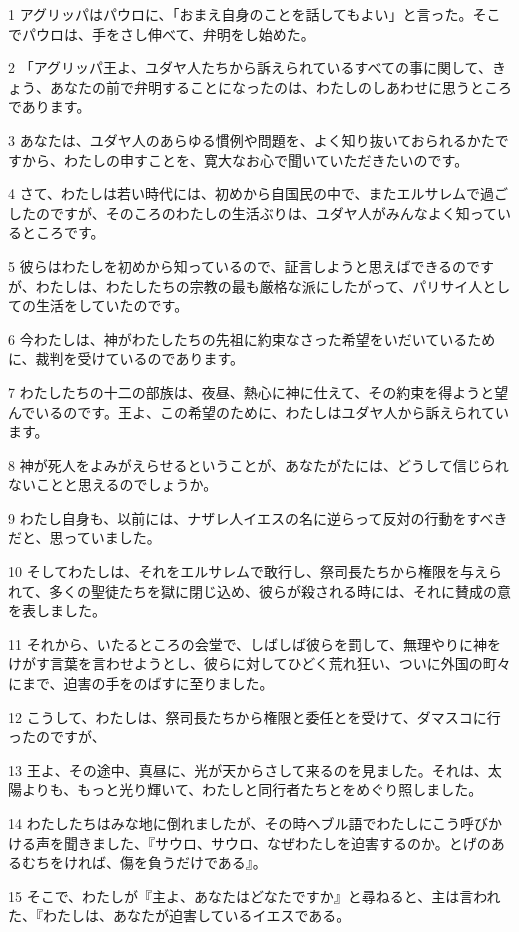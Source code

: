 \par 1 アグリッパはパウロに、「おまえ自身のことを話してもよい」と言った。そこでパウロは、手をさし伸べて、弁明をし始めた。
\par 2 「アグリッパ王よ、ユダヤ人たちから訴えられているすべての事に関して、きょう、あなたの前で弁明することになったのは、わたしのしあわせに思うところであります。
\par 3 あなたは、ユダヤ人のあらゆる慣例や問題を、よく知り抜いておられるかたですから、わたしの申すことを、寛大なお心で聞いていただきたいのです。
\par 4 さて、わたしは若い時代には、初めから自国民の中で、またエルサレムで過ごしたのですが、そのころのわたしの生活ぶりは、ユダヤ人がみんなよく知っているところです。
\par 5 彼らはわたしを初めから知っているので、証言しようと思えばできるのですが、わたしは、わたしたちの宗教の最も厳格な派にしたがって、パリサイ人としての生活をしていたのです。
\par 6 今わたしは、神がわたしたちの先祖に約束なさった希望をいだいているために、裁判を受けているのであります。
\par 7 わたしたちの十二の部族は、夜昼、熱心に神に仕えて、その約束を得ようと望んでいるのです。王よ、この希望のために、わたしはユダヤ人から訴えられています。
\par 8 神が死人をよみがえらせるということが、あなたがたには、どうして信じられないことと思えるのでしょうか。
\par 9 わたし自身も、以前には、ナザレ人イエスの名に逆らって反対の行動をすべきだと、思っていました。
\par 10 そしてわたしは、それをエルサレムで敢行し、祭司長たちから権限を与えられて、多くの聖徒たちを獄に閉じ込め、彼らが殺される時には、それに賛成の意を表しました。
\par 11 それから、いたるところの会堂で、しばしば彼らを罰して、無理やりに神をけがす言葉を言わせようとし、彼らに対してひどく荒れ狂い、ついに外国の町々にまで、迫害の手をのばすに至りました。
\par 12 こうして、わたしは、祭司長たちから権限と委任とを受けて、ダマスコに行ったのですが、
\par 13 王よ、その途中、真昼に、光が天からさして来るのを見ました。それは、太陽よりも、もっと光り輝いて、わたしと同行者たちとをめぐり照しました。
\par 14 わたしたちはみな地に倒れましたが、その時ヘブル語でわたしにこう呼びかける声を聞きました、『サウロ、サウロ、なぜわたしを迫害するのか。とげのあるむちをければ、傷を負うだけである』。
\par 15 そこで、わたしが『主よ、あなたはどなたですか』と尋ねると、主は言われた、『わたしは、あなたが迫害しているイエスである。
